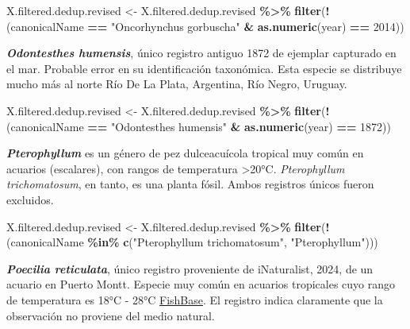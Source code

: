 \documentclass[sn-apa,pdflatex]{sn-jnl}
\newenvironment{Shaded}{\begin{snugshade}}{\end{snugshade}}
\newcommand{\DecValTok}[1]{\textcolor[rgb]{0.00,0.00,0.81}{#1}}
\newcommand{\FunctionTok}[1]{\textcolor[rgb]{0.13,0.29,0.53}{\textbf{#1}}}
\newcommand{\NormalTok}[1]{#1}
\newcommand{\OtherTok}[1]{\textcolor[rgb]{0.56,0.35,0.01}{#1}}
\newcommand{\SpecialCharTok}[1]{\textcolor[rgb]{0.81,0.36,0.00}{\textbf{#1}}}
\newcommand{\StringTok}[1]{\textcolor[rgb]{0.31,0.60,0.02}{#1}}
\begin{document}
\begin{Shaded}
\begin{Highlighting}[]
\NormalTok{X.filtered.dedup.revised }\OtherTok{\textless{}{-}}\NormalTok{ X.filtered.dedup.revised }\SpecialCharTok{\%\textgreater{}\%}
    \FunctionTok{filter}\NormalTok{(}\SpecialCharTok{!}\NormalTok{(canonicalName }\SpecialCharTok{==} \StringTok{"Oncorhynchus gorbuscha"} \SpecialCharTok{\&} \FunctionTok{as.numeric}\NormalTok{(year) }\SpecialCharTok{==}
        \DecValTok{2014}\NormalTok{))}
\end{Highlighting}
\end{Shaded}

\textbf{\emph{Odontesthes humensis}}, único registro antiguo 1872 de
ejemplar capturado en el mar. Probable error en su identificación
taxonómica. Esta especie se distribuye mucho más al norte Río De La
Plata, Argentina, Río Negro, Uruguay.

\begin{Shaded}
\begin{Highlighting}[]
\NormalTok{X.filtered.dedup.revised }\OtherTok{\textless{}{-}}\NormalTok{ X.filtered.dedup.revised }\SpecialCharTok{\%\textgreater{}\%}
    \FunctionTok{filter}\NormalTok{(}\SpecialCharTok{!}\NormalTok{(canonicalName }\SpecialCharTok{==} \StringTok{"Odontesthes humensis"} \SpecialCharTok{\&} \FunctionTok{as.numeric}\NormalTok{(year) }\SpecialCharTok{==}
        \DecValTok{1872}\NormalTok{))}
\end{Highlighting}
\end{Shaded}

\textbf{\emph{Pterophyllum}} es un género de pez dulceacuícola tropical
muy común en acuarios (escalares), con rangos de temperatura
\textgreater20°C. \emph{Pterophyllum trichomatosum}, en tanto, es una
planta fósil. Ambos registros únicos fueron excluidos.

\begin{Shaded}
\begin{Highlighting}[]
\NormalTok{X.filtered.dedup.revised }\OtherTok{\textless{}{-}}\NormalTok{ X.filtered.dedup.revised }\SpecialCharTok{\%\textgreater{}\%}
    \FunctionTok{filter}\NormalTok{(}\SpecialCharTok{!}\NormalTok{(canonicalName }\SpecialCharTok{\%in\%} \FunctionTok{c}\NormalTok{(}\StringTok{"Pterophyllum trichomatosum"}\NormalTok{,}
        \StringTok{"Pterophyllum"}\NormalTok{)))}
\end{Highlighting}
\end{Shaded}

\textbf{\emph{Poecilia reticulata}}, único registro proveniente de
iNaturalist, 2024, de un acuario en Puerto Montt. Especie muy común en
acuarios tropicales cuyo rango de temperatura es 18°C - 28°C
\href{https://www.fishbase.se/summary/Poecilia_reticulata.html}{FishBase}.
El registro indica claramente que la observación no proviene del medio
natural.
\end{document}
